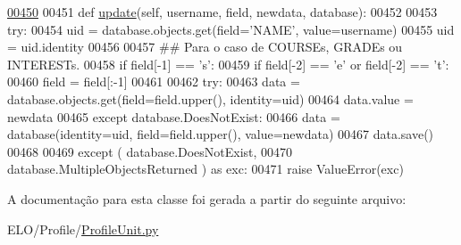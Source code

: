 \begin{DoxyCode}
\hypertarget{classProfile_1_1ProfileUnit_1_1PersProfile_l00450}{}\hyperlink{classProfile_1_1ProfileUnit_1_1PersProfile_af1e4b3cf0eee0a14b5113210503ff665}{00450} 
00451     \textcolor{keyword}{def }\hyperlink{classProfile_1_1ProfileUnit_1_1PersProfile_af1e4b3cf0eee0a14b5113210503ff665}{update}(self, username, field, newdata, database):
00452         
00453         \textcolor{keywordflow}{try}:
00454             uid = database.objects.get(field=\textcolor{stringliteral}{'NAME'}, value=username)
00455             uid = uid.identity
00456 
00457             \textcolor{comment}{## Para o caso de COURSEs, GRADEs ou INTERESTs.}
00458             \textcolor{keywordflow}{if} field[-1] == \textcolor{stringliteral}{'s'}:
00459                 \textcolor{keywordflow}{if} field[-2] == \textcolor{stringliteral}{'e'} \textcolor{keywordflow}{or} field[-2] == \textcolor{stringliteral}{'t'}:
00460                     field = field[:-1]
00461                 
00462             \textcolor{keywordflow}{try}:
00463                 data = database.objects.get(field=field.upper(), identity=uid)
00464                 data.value = newdata
00465             \textcolor{keywordflow}{except} database.DoesNotExist:
00466                 data = database(identity=uid, field=field.upper(), value=newdata)
00467             data.save()
00468 
00469         \textcolor{keywordflow}{except} ( database.DoesNotExist, 
00470                  database.MultipleObjectsReturned ) \textcolor{keyword}{as} exc:
00471             \textcolor{keywordflow}{raise} ValueError(exc)
\end{DoxyCode}


A documentação para esta classe foi gerada a partir do seguinte arquivo\-:\begin{DoxyCompactItemize}
\item 
E\-L\-O/\-Profile/\hyperlink{ProfileUnit_8py}{Profile\-Unit.\-py}\end{DoxyCompactItemize}
